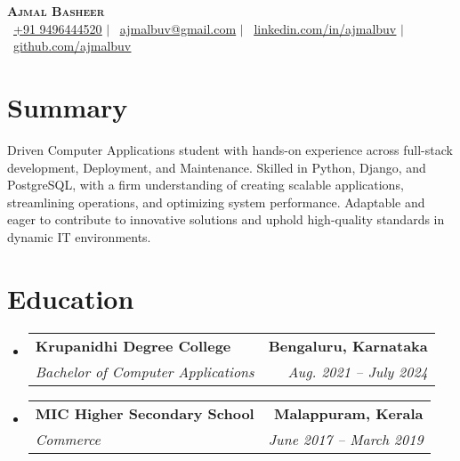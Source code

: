 \documentclass[a4paper,11pt]{article}
\makeatletter
\newcommand{\resumeSubheading}[4]{
  \vspace{-2pt}\item
    \begin{tabular*}{0.97\textwidth}[t]{l@{\extracolsep{\fill}}r}
      \textbf{#1} & \textbf{\small #2} \\
      \textit{\small#3} & \textit{\small #4} \\
    \end{tabular*}\vspace{-7pt}
}
\newcommand{\resumeSubHeadingListStart}{\begin{itemize}[leftmargin=0.15in, label={}]}
\newcommand{\resumeSubHeadingListEnd}{\end{itemize}}
\makeatother
\begin{document}
	
\begin{center}
	{\selectfont \textbf{ \Huge \scshape Ajmal Basheer}} \\ \vspace{1pt}
	\small{
		\raisebox{-0.1\height}\faPhone\ \href{tel:+919496444520}{\underline{+91 9496444520}} $|$ 
		\raisebox{-0.2\height}\faEnvelope\ \href{mailto:ajmalbuv@gmail.com}{\underline{ajmalbuv@gmail.com}} $|$ 
		\raisebox{-0.2\height}\faLinkedin\ \href{https://linkedin.com/in/ajmalbuv}{\underline{linkedin.com/in/ajmalbuv}} $|$
		\raisebox{-0.2\height}\faGithub\ \href{https://github.com/ajmalbuv}{\underline{github.com/ajmalbuv}}
	}
\end{center}

\section{Summary}
\begin{itemize}[leftmargin=0.15in, label={}]
  \small{\item{
        Driven Computer Applications student with hands-on experience across full-stack development, Deployment, and Maintenance. Skilled in Python, Django, and PostgreSQL, with a firm understanding of creating scalable applications, streamlining operations, and optimizing system performance. Adaptable and eager to contribute to innovative solutions and uphold high-quality standards in dynamic IT environments.
        }}
\end{itemize}
\section{Education}
\resumeSubHeadingListStart
\resumeSubheading
{Krupanidhi Degree College}{Bengaluru, Karnataka}
{Bachelor of Computer Applications}{Aug. 2021 -- July 2024}
\resumeSubheading
{MIC Higher Secondary School}{Malappuram, Kerala}
{Commerce}{June 2017 -- March 2019}
\resumeSubHeadingListEnd

\end{document}
